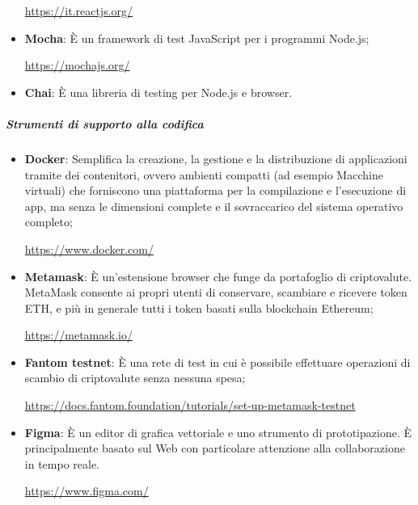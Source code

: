 \begin{itemize}
          \begin{center}\url{https://it.reactjs.org/}\end{center}
    \item \textbf{Mocha}: È un framework di test JavaScript\glo{} per i programmi Node.js;
          \begin{center}\url{https://mochajs.org/}\end{center}
    \item \textbf{Chai}: È una libreria di testing per Node.js e browser.
          \begin{center}\url{}\end{center}
\end{itemize}
\subparagraph{Strumenti di supporto alla codifica}
\begin{itemize}
    \item \textbf{Docker}: Semplifica la creazione, la gestione e la distribuzione di applicazioni tramite dei contenitori, ovvero ambienti compatti (ad esempio Macchine virtuali) che forniscono una piattaforma per la compilazione e l'esecuzione di app, ma senza le dimensioni complete e il sovraccarico del sistema operativo completo;
          \begin{center}\url{https://www.docker.com/}\end{center}
    \item \textbf{Metamask}: È un'estensione browser che funge da portafoglio di criptovalute\glo{}. MetaMask consente ai propri utenti di conservare, scambiare e ricevere token\glo{} ETH, e più in generale tutti i token\glo{} basati sulla blockchain\glo{} Ethereum\glo{};
          \begin{center}\url{https://metamask.io/}\end{center}
    \item \textbf{Fantom testnet}: È una rete di test in cui è possibile effettuare operazioni di scambio di criptovalute\glo{} senza nessuna spesa;
          \begin{center}\url{https://docs.fantom.foundation/tutorials/set-up-metamask-testnet}\end{center}
    \item \textbf{Figma}: È un editor di grafica vettoriale e uno strumento di prototipazione. È principalmente basato sul Web con particolare attenzione alla collaborazione in tempo reale.
          \begin{center}\url{https://www.figma.com/}\end{center}
\end{itemize}